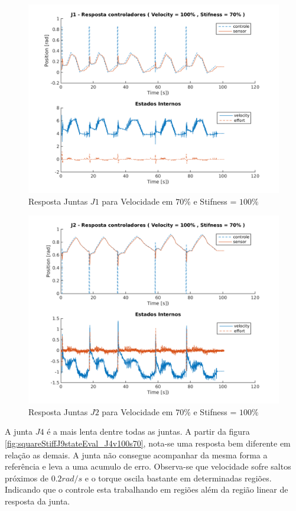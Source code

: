 \vspace{1cm}
\begin{figure}[H]
    \centering
    \includegraphics[width=0.6\linewidth,trim={2cm 1cm 2cm 2cm}]{tex/figs/squareStiffJ9stateEval_J1v100s70.png}
    \caption{Resposta Juntas $J1$ para Velocidade em $70\%$ e Stifness = $100\%$ }
    \label{fig:squareStiffJ9stateEval_J1v100s70}
\end{figure}

\vspace{1cm}

\begin{figure}[H]
    \centering
    \includegraphics[width=0.6\linewidth,trim={2cm 1cm 2cm 2cm}]{tex/figs/squareStiffJ9stateEval_J2v100s70.png}
    \caption{Resposta Juntas $J2$ para Velocidade em $70\%$ e Stifness = $100\%$ }
    \label{fig:squareStiffJ9stateEval_J2v100s70}
\end{figure}

A junta $J4$ é a mais lenta dentre todas as juntas. A partir da figura \ref{fig:squareStiffJ9stateEval_J4v100s70}, nota-se uma resposta bem diferente em relação as demais. A junta não consegue acompanhar da mesma forma a referência e leva a uma acumulo de erro. Observa-se que velocidade sofre saltos próximos de $0.2 rad/s$ e o torque oscila bastante em determinadas regiões. Indicando que o controle esta trabalhando em regiões além da região linear de resposta da junta.


